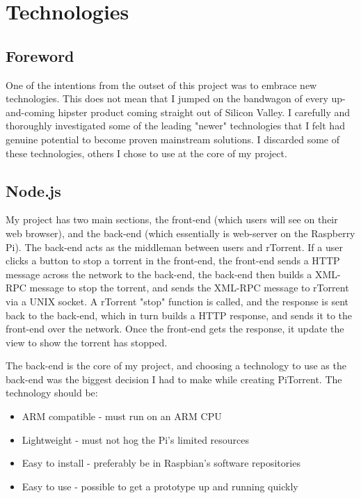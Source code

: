 \chapter{Technologies} 

\label{Chapter2} 



\section{Foreword}
One of the intentions from the outset of this project was to embrace new technologies. This does not mean that I jumped on the bandwagon of every up-and-coming hipster product coming straight out of Silicon Valley. I carefully and thoroughly investigated some of the leading "newer" technologies that I felt had genuine potential to become proven mainstream solutions. I discarded some of these technologies, others I chose to use at the core of my project. 


\section{Node.js}
My project has two main sections, the front-end (which users will see on their web browser), and the back-end (which essentially is web-server on the Raspberry Pi). The back-end acts as the middleman between users and rTorrent. If a user clicks a button to stop a torrent in the front-end, the front-end sends a HTTP message across the network to the back-end, the back-end then builds a XML-RPC message to stop the torrent, and sends the XML-RPC message to rTorrent via a UNIX socket. A rTorrent "stop" function is called, and the response is sent back to the back-end, which in turn builds a HTTP response, and sends it to the front-end over the network. Once the front-end gets the response, it update the view to show the torrent has stopped.

The back-end is the core of my project, and choosing a technology to use as the back-end was the biggest decision I had to make while creating PiTorrent. The technology should be:

\begin{itemize}
	\item ARM compatible - must run on an ARM CPU
	\item Lightweight - must not hog the Pi's limited resources
	\item Easy to install - preferably be in Raspbian's software repositories 
	\item Easy to use - possible to get a prototype up and running quickly
\end{itemize}

